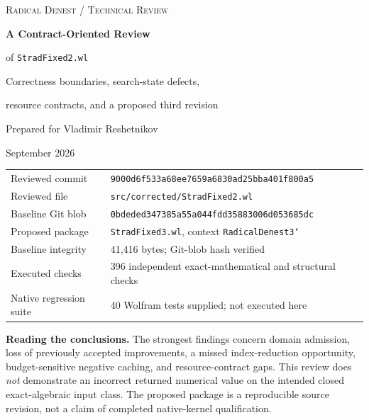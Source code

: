 \documentclass[11pt,a4paper]{article}
\theoremstyle{definition}\newtheorem{definition}[proposition]{Definition}
\theoremstyle{remark}\newtheorem{remark}[proposition]{Remark}
\begin{document}
\begin{titlepage}
\vspace*{15mm}
{\Large\color{ink}\textsc{Radical Denest / Technical Review}\par}
\vspace{11mm}
{\huge\bfseries A Contract-Oriented Review\par of \texttt{StradFixed2.wl}\par}
\vspace{6mm}
{\Large Correctness boundaries, search-state defects,\par resource contracts, and a proposed third revision\par}
\vspace{13mm}
{\large Prepared for Vladimir Reshetnikov\par}
{\large September 2026\par}
\vspace{12mm}
\begin{tabular}{@{}ll@{}}
Reviewed commit & \texttt{9000d6f533a68ee7659a6830ad25bba401f800a5}\\[3pt]
Reviewed file & \texttt{src/corrected/StradFixed2.wl}\\[3pt]
Baseline Git blob & \texttt{0bdeded347385a55a044fdd35883006d053685dc}\\[3pt]
Proposed package & \texttt{StradFixed3.wl}, context \texttt{RadicalDenest3`}\\[3pt]
Baseline integrity & 41,416 bytes; Git-blob hash verified\\[3pt]
Executed checks & 396 independent exact-mathematical and structural checks\\[3pt]
Native regression suite & 40 Wolfram tests supplied; not executed here
\end{tabular}
\vfill
\begin{minipage}{\textwidth}
\textbf{Reading the conclusions.} The strongest findings concern domain admission,
loss of previously accepted improvements, a missed index-reduction opportunity,
budget-sensitive negative caching, and resource-contract gaps. This review does
\emph{not} demonstrate an incorrect returned numerical value on the intended
closed exact-algebraic input class. The proposed package is a reproducible source
revision, not a claim of completed native-kernel qualification.
\end{minipage}
\end{titlepage}
\end{document}
